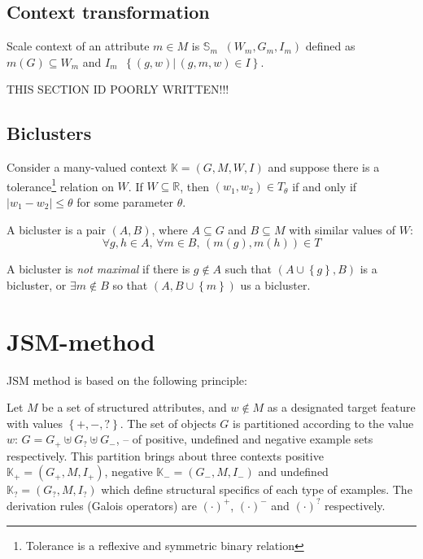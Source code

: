 \documentclass[a4paper]{article}
\newcommand{\obj}[1]{{\left\{ #1 \right \}}}
\newcommand{\brac}[1]{{\left ( #1 \right )}}
\newcommand{\induc}[1]{{\left . #1 \right \vert}}
\newcommand{\abs}[1]{{\left | #1 \right |}}
\newcommand{\Real}{\mathbb{R}}
\newcommand{\Ctx}{\mathbb{K}}
\newcommand{\defn}{\mathop{\overset{\Delta}{=}}\nolimits}
\begin{document}

\subsection{Context transformation} %
\label{sub:context_transformation}

Scale context of an attribute $m\in M$ is $\mathbb{S}_m\defn \brac{W_m, G_m, I_m}$ defined as $m(G) \subseteq W_m$ and $I_m\defn \obj{ \induc{(g,w)}\,(g,m,w)\in I }$.

THIS SECTION ID POORLY WRITTEN!!!


\subsection{Biclusters} %
\label{sub:biclusters}
Consider a many-valued context $\Ctx=\brac{G,M,W,I}$ and suppose there is a tolerance\footnote{Tolerance is a reflexive and symmetric binary relation} relation on $W$. If $W\subseteq \Real$, then $(w_1,w_2)\in T_\theta$ if and only if $\abs{w_1-w_2}\leq \theta$ for some parameter $\theta$.

A bicluster is a pair $(A,B)$, where $A\subseteq G$ and $B\subseteq M$ with similar values of $W$:\[\forall g,h\in A,\, \forall m\in B,\,\brac{m(g), m(h)}\in T\]

A bicluster is \emph{not maximal} if there is $g\notin A$ such that $\brac{A\cup\obj{g},B}$ is a bicluster, or $\exists m\notin B$ so that $\brac{A,B\cup\obj{m}}$ us a bicluster.



\section{JSM-method} %
\label{sec:dsm_method}

JSM method is based on the following principle: %

Let $M$ be a set of structured attributes, and $w\notin M$ as a designated target feature with values $\obj{+,-,?}$. The set of objects $G$ is partitioned according to the value $w$: $G=G_+\uplus G_? \uplus G_-$, -- of positive, undefined and negative example sets respectively. This partition brings about three contexts positive $\Ctx_+ = \brac{G_+,M,I_+}$, negative $\Ctx_- = \brac{G_-,M,I_-}$ and undefined $\Ctx_? = \brac{G_?,M,I_?}$ which define structural specifics of each type of examples. The derivation rules (Galois operators) are ${(\cdot)}^+$, ${(\cdot)}^-$ and ${(\cdot)}^?$ respectively.
\end{document}
